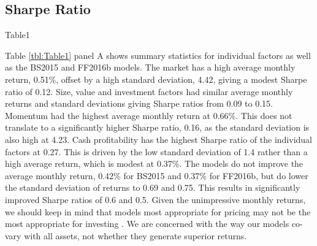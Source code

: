 
\subsection{Sharpe Ratio}

{Table1}

Table \ref{tbl:Table1} panel A shows summary statistics for individual factors as well as the 
BS2015 and FF2016b models.
The market has a high average monthly return, 0.51\%, offset by a high standard deviation, 
4.42, giving a modest Sharpe ratio of 0.12.
Size, value and investment factors had similar average monthly returns and standard deviations 
giving Sharpe ratios from 0.09 to 0.15.
Momentum had the highest average monthly return at 0.66\%.
This does not translate to a significantly higher Sharpe ratio, 0.16, as the standard 
deviation is also high at 4.23.
Cash profitability has the highest Sharpe ratio of the individual factors at 0.27.
This is driven by the low standard deviation of 1.4 rather than a high average return, which 
is modest at 0.37\%.
The models do not improve the average monthly return, 0.42\% for BS2015 and 0.37\% for 
FF2016b, but do lower the standard deviation of returns to 0.69 and 0.75.
This results in significantly improved Sharpe ratios of 0.6 and 0.5.
Given the unimpressive monthly returns, we should keep in mind that models most 
appropriate for pricing may not be the most appropriate for investing 
\parencite{pastor2000comparing}.
We are concerned with the way our models co-vary with all assets, not whether they 
generate superior returns.

